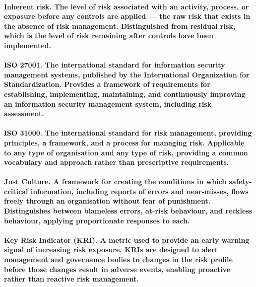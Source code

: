 \paragraph{\textbf{Inherent risk}. The level of risk associated with an activity, process, or exposure before any controls are applied — the raw risk that exists in the absence of risk management. Distinguished from residual risk, which is the level of risk remaining after controls have been implemented.}

\paragraph{\textbf{ISO 27001}. The international standard for information security management systems, published by the International Organization for Standardization. Provides a framework of requirements for establishing, implementing, maintaining, and continuously improving an information security management system, including risk assessment.}

\paragraph{\textbf{ISO 31000}. The international standard for risk management, providing principles, a framework, and a process for managing risk. Applicable to any type of organisation and any type of risk, providing a common vocabulary and approach rather than prescriptive requirements.}

\paragraph{\textbf{Just Culture}. A framework for creating the conditions in which safety-critical information, including reports of errors and near-misses, flows freely through an organisation without fear of punishment. Distinguishes between blameless errors, at-risk behaviour, and reckless behaviour, applying proportionate responses to each.}

\paragraph{\textbf{Key Risk Indicator (KRI)}. A metric used to provide an early warning signal of increasing risk exposure. KRIs are designed to alert management and governance bodies to changes in the risk profile before those changes result in adverse events, enabling proactive rather than reactive risk management.}

